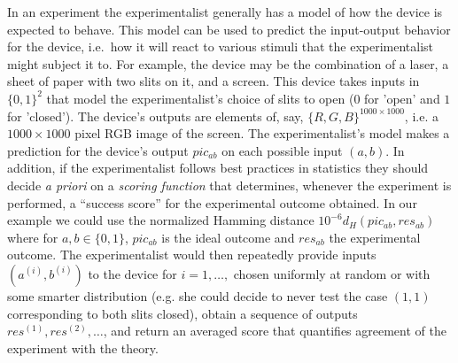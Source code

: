 In an experiment the experimentalist generally has a model of how the device is expected to behave. This model can be used to predict the input-output behavior for the device, i.e.\ how it will react to various stimuli that the experimentalist might subject it to. For example, the device may be the combination of a laser, a sheet of paper with two slits on it, and a screen. This device takes inputs in $\{0,1\}^2$ that model the experimentalist's choice of slits to open ($0$ for 'open' and $1$ for 'closed'). The device's outputs are elements of, say, $\{R,G,B\}^{1000\times 1000}$, i.e. a $1000\times 1000$ pixel RGB image of the screen. The experimentalist's model makes a prediction for the device's output $pic_{ab}$ on each possible input $(a,b)$. In addition, if the experimentalist follows best practices in statistics they should decide \emph{a priori} on a \emph{scoring function} that determines, whenever the experiment is performed, a ``success score'' for the experimental outcome obtained. In our example we could use the normalized Hamming distance $10^{-6} d_H(pic_{ab},res_{ab})$ where for $a,b\in\{0,1\}$, $pic_{ab}$ is the ideal outcome and $res_{ab}$ the experimental outcome. The experimentalist would then repeatedly provide inputs $(a^{(i)},b^{(i)})$ to the device for $i=1,\ldots,$ chosen uniformly at random or with some smarter distribution (e.g. she could decide to never test the case $(1,1)$ corresponding to both slits closed), obtain a sequence of outputs $res^{(1)},res^{(2)},\ldots$, and return an averaged score that quantifies  agreement of the experiment with the theory. 


